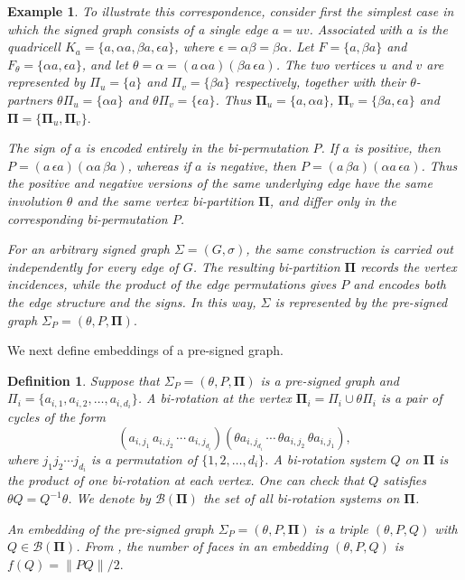 \documentclass[10pt,a4paper]{amsart}
\newtheorem{definition}[theorem]{Definition}
\newtheorem{example}[theorem]{Example}
\begin{document}
\begin{example}  To illustrate this correspondence, consider first the simplest case in which the signed graph consists of a single edge $a=uv$. Associated with $a$ is the quadricell $K_a=\{a,\alpha a,\beta a,\epsilon a\}$, where $\epsilon=\alpha\beta=\beta\alpha$. Let $F=\{a,\beta a\}$ and $F_{\theta}=\{\alpha a,\epsilon a\}$, and let $\theta=\alpha=(a\,\alpha a)(\beta a\,\epsilon a)$. The two vertices $u$ and $v$ are represented by $\Pi_u=\{a\}$ and $\Pi_v=\{\beta a\}$ respectively, together with their $\theta$-partners $\theta\Pi_u=\{\alpha a\}$ and $\theta\Pi_v=\{\epsilon a\}$. Thus $\mathbf{\Pi}_u=\{a,\alpha a\}$, $\mathbf{\Pi}_v=\{\beta a,\epsilon a\}$ and $\mathbf{\Pi}=\{\mathbf{\Pi}_u, \mathbf{\Pi}_v\}.$

The sign of $a$ is encoded entirely in the bi-permutation $P$. If $a$ is positive, then $P=(a\,\epsilon a)(\alpha a\,\beta a)$, whereas if $a$ is negative, then $P=(a\,\beta a)(\alpha a\,\epsilon a)$. Thus the positive and negative versions of the same underlying edge have the same involution $\theta$ and the same vertex bi-partition $\mathbf{\Pi}$, and differ only in the corresponding bi-permutation $P$.

For an arbitrary signed graph $\Sigma=(G,\sigma)$, the same construction is carried out independently for every edge of $G$. The resulting bi-partition $\mathbf{\Pi}$ records the vertex incidences, while the product of the edge permutations gives $P$ and encodes both the edge structure and the signs. In this way, $\Sigma$ is represented by the pre-signed graph
$\Sigma_P=(\theta, P, \mathbf{\Pi}).$
\end{example}

We next define embeddings of a pre-signed graph.
\begin{definition} Suppose that $\Sigma_P=(\theta,P,\mathbf{\Pi})$ is a pre-signed graph and $\Pi_i=\{a_{i,1},a_{i,2},\ldots,a_{i,d_i}\}$. A \emph{bi-rotation} at the vertex $\mathbf{\Pi}_i=\Pi_i\cup\theta\Pi_i$ is a pair of cycles of the form $$(a_{i,j_1}\,a_{i,j_2}\,\cdots\,a_{i,j_{d_i}})(\theta a_{i,j_{d_i}}\,\cdots\,\theta a_{i,j_2}\,\theta a_{i,j_1}),$$ where $j_1j_2\cdots j_{d_i}$ is a permutation of $\{1,2,\ldots,d_i\}$. A \emph{bi-rotation system} $Q$ on $\mathbf{\Pi}$ is the product of one bi-rotation at each vertex. One can check that $Q$ satisfies $\theta Q=Q^{-1} \theta$. We denote by $\mathcal B(\mathbf{\Pi})$ the set of all bi-rotation systems on $\mathbf{\Pi}$.

An \emph{embedding} of the pre-signed graph $\Sigma_P=(\theta,P,\mathbf{\Pi})$ is a triple $(\theta,P,Q)$ with $Q\in\mathcal B(\mathbf{\Pi})$.
From \cite{Chen2026PreSigned}, the number of faces in an embedding $(\theta,P,Q)$ is
$f(Q)=\lVert PQ\rVert/2.$
\end{definition}
\end{document}
